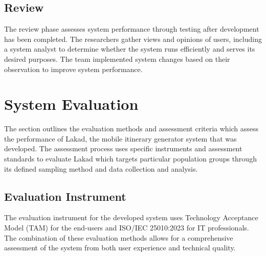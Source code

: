 \subsection{Review}
The review phase assesses system performance through testing after development has been completed. The researchers gather views and opinions of users, including a system analyst to determine whether the system runs efficiently and serves its desired purposes. The team implemented system changes based on their observation to improve system performance.

\section{System Evaluation}

The section outlines the evaluation methods and assessment criteria which assess the performance of Lakad, the mobile itinerary generator system that was developed. The assessment process uses specific instruments and assessment standards to evaluate Lakad which targets particular population groups through its defined sampling method and data collection and analysis.

\subsection{Evaluation Instrument}
The evaluation instrument for the developed system uses Technology Acceptance Model (TAM) for the end-users and ISO/IEC 25010:2023 for IT professionals. The combination of these evaluation methods allows for a comprehensive assessment of the system from both user experience and technical quality. 

